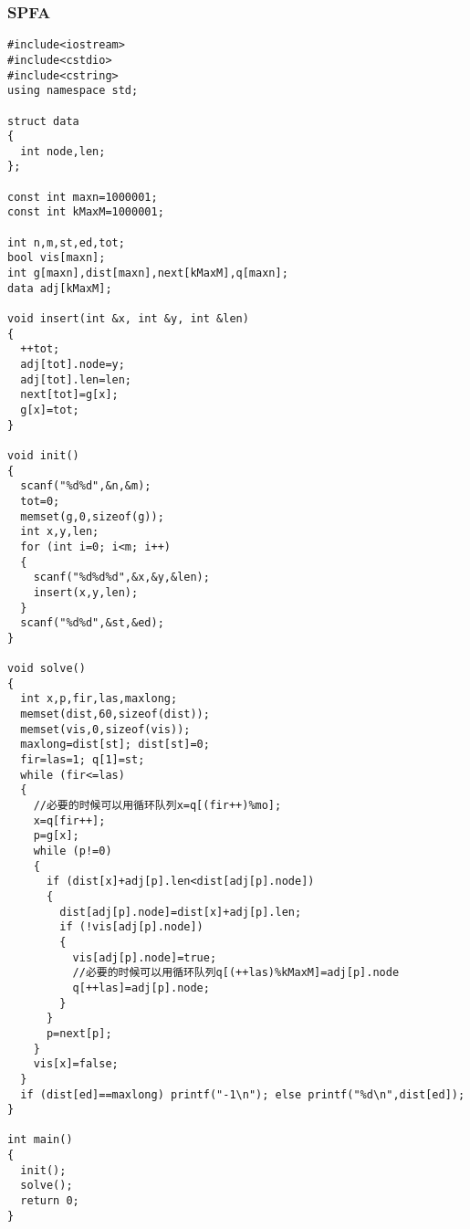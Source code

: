 \subsubsection{SPFA}
\begin{verbatim}
#include<iostream>
#include<cstdio>
#include<cstring>
using namespace std;

struct data
{
  int node,len;
};

const int maxn=1000001;
const int kMaxM=1000001;

int n,m,st,ed,tot;
bool vis[maxn];
int g[maxn],dist[maxn],next[kMaxM],q[maxn];
data adj[kMaxM];

void insert(int &x, int &y, int &len)
{
  ++tot;
  adj[tot].node=y;
  adj[tot].len=len;
  next[tot]=g[x];
  g[x]=tot;
}

void init()
{
  scanf("%d%d",&n,&m);
  tot=0;
  memset(g,0,sizeof(g));
  int x,y,len;
  for (int i=0; i<m; i++)
  {
    scanf("%d%d%d",&x,&y,&len);
    insert(x,y,len);
  }
  scanf("%d%d",&st,&ed);
}

void solve()
{
  int x,p,fir,las,maxlong;
  memset(dist,60,sizeof(dist));
  memset(vis,0,sizeof(vis));
  maxlong=dist[st]; dist[st]=0;
  fir=las=1; q[1]=st;
  while (fir<=las)
  {
    //必要的时候可以用循环队列x=q[(fir++)%mo];
    x=q[fir++];
    p=g[x];
    while (p!=0)
    {
      if (dist[x]+adj[p].len<dist[adj[p].node])
      {
        dist[adj[p].node]=dist[x]+adj[p].len;
        if (!vis[adj[p].node])
        {
          vis[adj[p].node]=true;
          //必要的时候可以用循环队列q[(++las)%kMaxM]=adj[p].node
          q[++las]=adj[p].node;
        }
      }
      p=next[p];
    }
    vis[x]=false;
  }
  if (dist[ed]==maxlong) printf("-1\n"); else printf("%d\n",dist[ed]);
}

int main()
{
  init();
  solve();
  return 0;
}

\end{verbatim}

